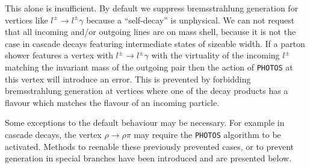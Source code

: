 \documentclass[]{Photos_interface_design}
\begin{document}
This alone is insufficient. By default we suppress bremsstrahlung
generation for vertices like $l^\pm \to l^\pm \gamma$ because a
``self-decay'' is unphysical. We can not request that all incoming
and/or outgoing lines are on mass shell, because it is not the case in
cascade decays featuring intermediate states of sizeable width. If a
parton shower features a vertex with $l^\pm \to l^\pm \gamma$ with the
virtuality of the incoming $l^\pm$ matching the invariant mass of the
outgoing pair then the action of {\tt PHOTOS} at this vertex will
introduce an error.  This is prevented by forbidding bremsstrahlung
generation at vertices where one of the decay products has a flavour
which matches the flavour of an incoming particle.


Some exceptions to the default behaviour may be necessary. For example
in cascade decays, the vertex $\rho \to \rho \pi$ may require the
{\tt PHOTOS} algorithm to be activated.
Methods to reenable these previously prevented cases, or to prevent generation in special
branches have been introduced and are presented below. \\ \\ 
\end{document}

